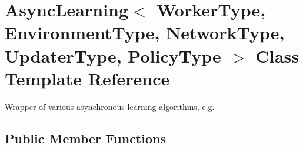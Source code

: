 \section{Async\+Learning$<$ Worker\+Type, Environment\+Type, Network\+Type, Updater\+Type, Policy\+Type $>$ Class Template Reference}
\label{classmlpack_1_1rl_1_1AsyncLearning}


Wrapper of various asynchronous learning algorithms, e.\+g.  


\subsection*{Public Member Functions}
